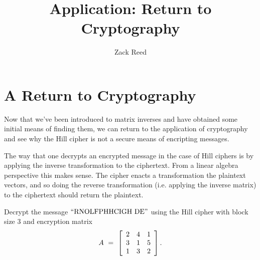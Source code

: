 \documentclass{ximera}
\author{Zack Reed}
\title{Application: Return to Cryptography}
\begin{document}
\begin{abstract}

\end{abstract}
\maketitle


\section*{A Return to Cryptography}

Now that we've been introduced to matrix inverses and have obtained some initial means of finding them, we can return to the application of cryptography and see why the Hill cipher is not a secure means of encripting messages.

The way that one decrypts an encrypted message in the case of Hill ciphers is by applying the inverse transformation to the ciphertext. From a linear algebra perspective this makes sense. The cipher enacts a transformation the plaintext vectors, and so doing the reverse transformation (i.e. applying the inverse matrix) to the ciphertext should return the plaintext.

\begin{example}\label{ex:hill-cipher-decryption}

  Decrypt the message $\q{RNOLFPHHCIGH DE}$ using the Hill cipher with
  block size $3$ and encryption matrix
  \begin{equation*}
    A ~=~ \startmat{ccc}
      2 & 4 & 1 \\
      3 & 1 & 5 \\
      1 & 3 & 2 \\
    \stopmat.
  \end{equation*}
\end{example}
\end{document}
